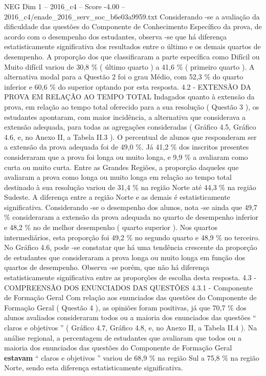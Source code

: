 \begin{textsample}{NEG Dim 1 – 2016\_c4 – Score -4.00 – 2016\_c4/enade\_2016\_serv\_soc\_b6e03a9959.txt}
Considerando -se a avaliação da dificuldade das questões do Componente de Conhecimento Específico da prova, de acordo com o desempenho dos estudantes, observa -se que há diferença estatisticamente significativa dos resultados entre o último e os demais quartos de desempenho.
A proporção dos que classificaram a parte específica como Difícil ou Muito difícil variou de 30,8 \% ( último quarto ) a 41,6 \% ( primeiro quarto ).
A alternativa modal para a Questão 2 foi o grau Médio, com 52,3 \% do quarto inferior e 60,6 \% do superior optando por esta resposta. 4.2 - EXTENSÃO DA PROVA EM RELAÇÃO AO TEMPO TOTAL Indagados quanto à extensão da prova, em relação ao tempo total oferecido para a sua resolução ( Questão 3 ), os estudantes apontaram, com maior incidência, a alternativa que considerava a extensão adequada, para todas as agregações consideradas ( Gráfico 4.5, Gráfico 4.6, e, no Anexo II, a Tabela II.3 ).
O percentual de alunos que responderam ser a extensão da prova adequada foi de 49,0 \%.
Já 41,2 \% dos inscritos presentes consideraram que a prova foi longa ou muito longa, e 9,9 \% a avaliaram como curta ou muito curta.
Entre as Grandes Regiões, a proporção daqueles que avaliaram a prova como longa ou muito longa em relação ao tempo total destinado à sua resolução variou de 31,4 \% na região Norte até 44,3 \% na região Sudeste.
A diferença entre a região Norte e as demais é estatisticamente significativa.
Considerando -se o desempenho dos alunos, nota -se ainda que 49,7 \% consideraram a extensão da prova adequada no quarto de desempenho inferior e 48,2 \% no de melhor desempenho ( quarto superior ).
Nos quartos intermediários, esta proporção foi 49,2 \% no segundo quarto e 48,9 \% no terceiro.
No Gráfico 4.6, pode -se constatar que há uma tendência crescente da proporção de estudantes que consideraram a prova longa ou muito longa em função dos quartos de desempenho.
Observa -se porém, que não há diferença estatisticamente significativa entre as proporções de escolha desta resposta. 4.3 - COMPREENSÃO DOS ENUNCIADOS DAS QUESTÕES 4.3.1 - Componente de Formação Geral Com relação aos enunciados das questões do Componente de Formação Geral ( Questão 4 ), as opiniões foram positivas, já que 70,7 \% dos alunos avaliados consideraram todos ou a maioria dos enunciados das questões “ claros e objetivos ” ( Gráfico 4.7, Gráfico 4.8, e, no Anexo II, a Tabela II.4 ).
Na análise regional, a percentagem de estudantes que avaliaram que todos ou a maioria dos enunciados das questões do Componente de Formação Geral \textbf{estavam} “ claros e objetivos ” variou de 68,9 \% na região Sul a 75,8 \% na região Norte, sendo esta diferença estatisticamente significativa.

\end{textsample}
